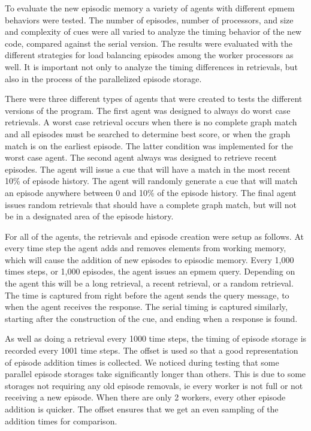 \documentclass[11pt]{article} %
\begin{document}
To evaluate the new episodic memory a variety of agents with different epmem
behaviors were tested. The number of episodes, number of processors, and size
and complexity of cues were all varied to analyze the timing behavior of the new
code, compared against the serial version. The results were evaluated with the
different strategies for load balancing episodes among the worker processors as
well. It is important not only to analyze the timing differences in retrievals,
but also in the process of the parallelized episode storage.

There were three different types of agents that were created to tests the
different versions of the program. The first agent was designed to always do
worst case retrievals. A worst case retrieval occurs when there is no complete
graph match and all episodes must be searched to determine best score, or when
the graph match is on the earliest episode. The latter condition was implemented
for the worst case agent. The second agent always was designed to retrieve
recent episodes. The agent will issue a cue that will have a match in the most
recent 10\% of episode history. The agent will randomly generate a cue that will
match an episode anywhere between 0 and 10\% of the episode history. The final
agent issues random retrievals that should have a complete graph match, but will
not be in a designated area of the episode history.

For all of the agents, the retrievals and episode creation were setup as
follows. At every time step the agent adds and removes elements from working
memory, which will cause the addition of new episodes to episodic memory. Every
1,000 times steps, or 1,000 episodes, the agent issues an epmem query. Depending
on the agent this will be a long retrieval, a recent retrieval, or a random
retrieval. The time is captured from right before the agent sends the query
message, to when the agent receives the response. The serial timing is captured
similarly, starting after the construction of the cue, and ending when a
response is found.

As well as doing a retrieval every 1000 time steps, the timing of episode
storage is recorded every 1001 time steps. The offset is used so that a good
representation of episode addition times is collected. We noticed during testing
that some parallel episode storages take significantly longer than others. This
is due to some storages not requiring any old episode removals, ie every worker
is not full or not receiving a new episode. When there are only 2 workers, every
other episode addition is quicker. The offset ensures that we get an even
sampling of the addition times for comparison.
\end{document}
